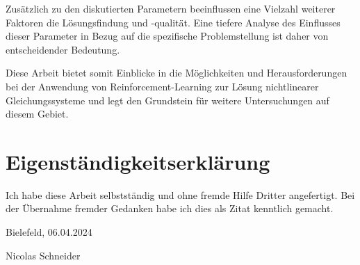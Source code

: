 \documentclass{article}
\theoremstyle{newline}
\begin{document}
\begin{onehalfspace}
Zusätzlich zu den diskutierten Parametern beeinflussen eine Vielzahl weiterer Faktoren die Lösungsfindung und -qualität. Eine tiefere Analyse des Einflusses dieser Parameter in Bezug auf die spezifische Problemstellung ist daher von entscheidender Bedeutung.

Diese Arbeit bietet somit Einblicke in die Möglichkeiten und Herausforderungen bei der Anwendung von Reinforcement-Learning zur Lösung nichtlinearer Gleichungssysteme und legt den Grundstein für weitere Untersuchungen auf diesem Gebiet. 


\newpage

\clearpage %


\printbibliography

\newpage

\section{Eigenständigkeitserklärung}

Ich habe diese Arbeit selbstständig und ohne fremde Hilfe Dritter angefertigt. Bei der Übernahme fremder Gedanken habe ich dies als Zitat kenntlich gemacht. 

Bielefeld, 06.04.2024

Nicolas Schneider

\end{onehalfspace}
\end{document}
